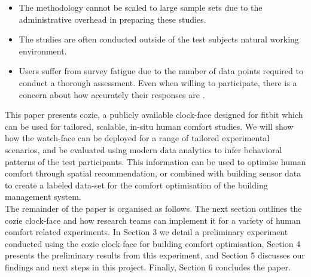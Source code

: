 \begin{itemize}
  \item The methodology cannot be scaled to large sample sets due to the administrative overhead in preparing these studies.
  \item The studies are often conducted outside of the test subjects natural working environment.
  \item Users suffer from survey fatigue \cite{porter2004multiple} due to the number of data points required to conduct a thorough assessment. Even when willing to participate, there is a concern about how accurately their responses are \cite{Clear2018}.
\end{itemize}



This paper presents cozie, a publicly available clock-face designed for fitbit which can be used for tailored, scalable, in-situ human comfort studies. We will show how the watch-face can be deployed for a range of tailored experimental scenarios, and be evaluated using modern data analytics to infer behavioral patterns of the test participants. This information can be used to optimise human comfort through spatial recommendation, or combined with building sensor data to create a labeled data-set for the comfort optimisation of the building management system. \\




The remainder of the paper is organised as follows. The next section outlines the cozie clock-face and how research teams can implement it for a variety of human comfort related experiments. In Section 3 we detail a preliminary experiment conducted using the cozie clock-face for building comfort optimisation, Section 4 presents the preliminary results from this experiment, and Section 5 discusses our findings and next steps in this project. Finally, Section 6 concludes the paper. 










